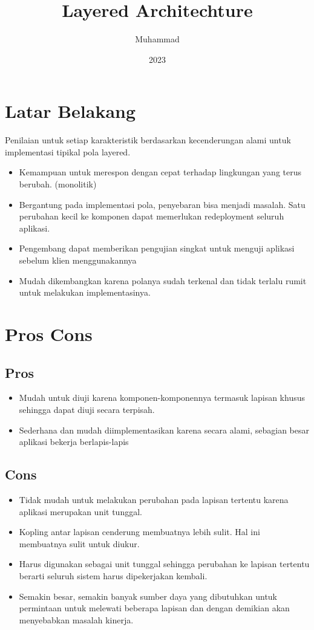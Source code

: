\documentclass[a4paper,12pt]{book}
\begin{document}
	\title{Layered Architechture}
	\author{Muhammad}
	\date{2023}
	\maketitle
	
\section{Latar Belakang}
Penilaian untuk setiap karakteristik berdasarkan kecenderungan alami untuk implementasi tipikal pola layered.
\begin{itemize}
	\item Kemampuan untuk merespon dengan cepat terhadap lingkungan yang terus berubah. (monolitik)
	\item Bergantung pada implementasi pola, penyebaran bisa menjadi masalah. Satu perubahan kecil ke komponen dapat memerlukan redeployment seluruh aplikasi.
	\item Pengembang dapat memberikan pengujian singkat untuk menguji aplikasi sebelum klien menggunakannya
	\item Mudah dikembangkan karena polanya sudah terkenal dan tidak terlalu rumit untuk melakukan implementasinya.
\end{itemize}

\section{Pros Cons}
\subsection{Pros}
\begin{itemize}
\item Mudah untuk diuji karena komponen-komponennya termasuk lapisan khusus sehingga dapat diuji secara terpisah.
\item Sederhana dan mudah diimplementasikan karena secara alami, sebagian besar aplikasi bekerja berlapis-lapis
\end{itemize}

\subsection{Cons}
\begin{itemize}
\item Tidak mudah untuk melakukan perubahan pada lapisan tertentu karena aplikasi merupakan unit tunggal.  
\item Kopling antar lapisan cenderung membuatnya lebih sulit. Hal ini membuatnya sulit untuk diukur. 
\item Harus digunakan sebagai unit tunggal sehingga perubahan ke lapisan tertentu berarti seluruh sistem harus dipekerjakan kembali. 
\item Semakin besar, semakin banyak sumber daya yang dibutuhkan untuk permintaan untuk melewati beberapa lapisan dan dengan demikian akan menyebabkan masalah kinerja.
\end{itemize}
\end{document}
